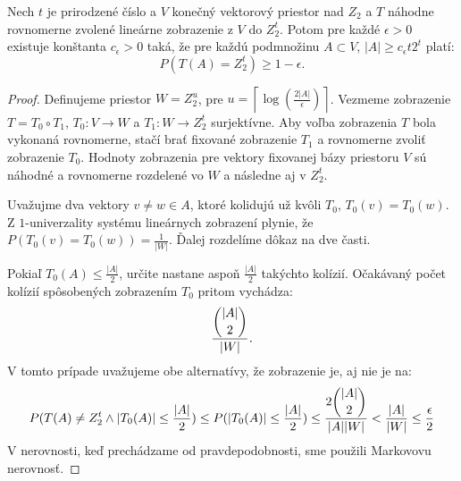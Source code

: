 \begin{theorem}
\label{theorem-set-onto-by-linear-transform}
Nech $t$ je prirodzené číslo a $V$ konečný vektorový priestor nad $Z_2$ a $T$ náhodne rovnomerne zvolené lineárne zobrazenie z $V$ do $Z_2^{t}$. Potom pre každé $\epsilon > 0$ existuje konštanta $c_\epsilon > 0$ taká, že pre každú podmnožinu $A \subset V$, $|A| \geq c_\epsilon t 2^t$ platí:
\begin{displaymath}
P(T(A) = Z_2^t) \geq 1 - \epsilon \textit{.}
\end{displaymath}
\end{theorem}
\begin{proof}
Definujeme priestor $W = Z_2^u$, pre $u = \left\lceil \log (\frac{2|A|}{\epsilon}) \right\rceil$. Vezmeme zobrazenie $T = T_0 \circ T_1$, $T_0: V \rightarrow W$ a $T_1: W \rightarrow Z_2^t$ surjektívne. Aby voľba zobrazenia $T$ bola vykonaná rovnomerne, stačí brať fixované zobrazenie $T_1$ a rovnomerne zvoliť zobrazenie $T_0$. Hodnoty zobrazenia pre vektory fixovanej bázy priestoru $V$ sú náhodné a rovnomerne rozdelené vo $W$ a následne aj v $Z_2^t$.

Uvažujme dva vektory $v \neq w \in A$, ktoré kolidujú už kvôli $T_0$, $T_0(v) = T_0(w)$. Z $1$-univerzality systému lineárnych zobrazení plynie, že $P(T_0(v) = T_0(w)) = \frac{1}{|W|}$. Ďalej rozdelíme dôkaz na dve časti. 

Pokiaľ $T_0(A) \leq \frac{|A|}{2}$, určite nastane aspoň $\frac{|A|}{2}$ takýchto kolízií. Očakávaný počet kolízií spôsobených zobrazením $T_0$ pritom vychádza:
\[
\frac{\dbinom{|A|}{2}}{|W|}\textit{.}
\]
V tomto prípade uvažujeme obe alternatívy, že zobrazenie je, aj nie je na:
\begin{displaymath}
P(T(A) \neq Z_2^t \wedge |T_0(A)| \leq \frac{|A|}{2}) \leq P(|T_0(A)| \leq \frac{|A|}{2}) \leq \frac{2 \dbinom{|A|}{2}}{|A||W|} < \frac{|A|}{|W|} \leq \frac{\epsilon}{2}
\end{displaymath}
V nerovnosti, keď prechádzame od pravdepodobnosti, sme použili Markovovu nerovnosť.


\end{proof}
